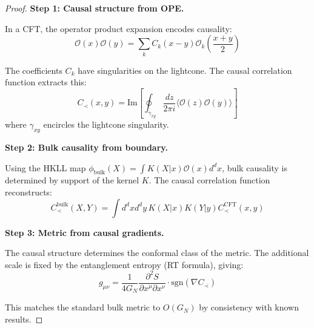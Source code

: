 \documentclass[12pt,a4paper]{article}
\begin{document}
\begin{proof}
\textbf{Step 1: Causal structure from OPE.}

In a CFT, the operator product expansion encodes causality:
\begin{equation}
\mathcal{O}(x)\mathcal{O}(y) = \sum_k C_k(x-y) \mathcal{O}_k\left(\frac{x+y}{2}\right)
\end{equation}

The coefficients $C_k$ have singularities on the lightcone. The causal correlation function extracts this:
\begin{equation}
C_\prec(x,y) = \text{Im}\left[ \oint_{\gamma_{xy}} \frac{dz}{2\pi i} \langle \mathcal{O}(z)\mathcal{O}(y) \rangle \right]
\end{equation}
where $\gamma_{xy}$ encircles the lightcone singularity.

\textbf{Step 2: Bulk causality from boundary.}

Using the HKLL map $\phi_{\text{bulk}}(X) = \int K(X|x) \mathcal{O}(x) d^dx$, bulk causality is determined by support of the kernel $K$. The causal correlation function reconstructs:
\begin{equation}
C_\prec^{\text{bulk}}(X, Y) = \int d^dx d^dy \, K(X|x) K(Y|y) C_\prec^{\text{CFT}}(x,y)
\end{equation}

\textbf{Step 3: Metric from causal gradients.}

The causal structure determines the conformal class of the metric. The additional scale is fixed by the entanglement entropy (RT formula), giving:
\begin{equation}
g_{\mu\nu} = \frac{1}{4G_N} \frac{\partial^2 S}{\partial x^\mu \partial x^\nu} \cdot \text{sgn}(\nabla C_\prec)
\end{equation}

This matches the standard bulk metric to $O(G_N)$ by consistency with known results.
\end{proof}
\end{document}
